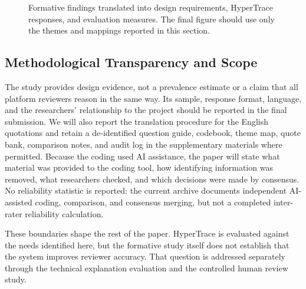 \begin{figure}[t]
  \centering
  \caption{Formative findings translated into design requirements, HyperTrace responses, and evaluation measures. The final figure should use only the themes and mappings reported in this section.}
  \label{fig:formative-to-requirements}
\end{figure}

\subsection{Methodological Transparency and Scope}
\label{sec:formative-transparency}

The study provides design evidence, not a prevalence estimate or a claim that
all platform reviewers reason in the same way. Its sample, response format,
language, and the researchers' relationship to the project should be reported
in the final submission. We will also report the
translation procedure for the English quotations and retain a de-identified
question guide, codebook, theme map, quote bank, comparison notes, and audit
log in the supplementary materials where permitted. Because the coding used
AI assistance, the paper will state what material was provided to the coding
tool, how identifying information was removed, what researchers checked, and
which decisions were made by consensus. No reliability statistic is reported:
the current archive documents independent AI-assisted coding, comparison, and
consensus merging, but not a completed inter-rater reliability calculation.

These boundaries shape the rest of the paper. HyperTrace is evaluated against
the needs identified here, but the formative study itself does not establish
that the system improves reviewer accuracy. That question is addressed
separately through the technical explanation evaluation and the controlled
human review study.
